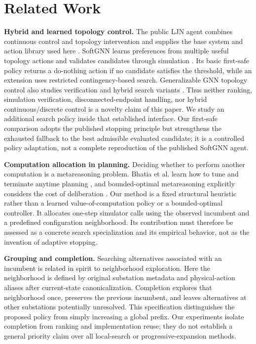 \documentclass[letterpaper]{article}
\begin{document}
\section{Related Work}

\textbf{Hybrid and learned topology control.} The public LJN agent combines continuous control and topology intervention and supplies the base system and action library used here \citep{ljn2023agent}. SoftGNN learns preferences from multiple useful topology actions and validates candidates through simulation \citep{hassouna2025softgnn}. Its basic first-safe policy returns a do-nothing action if no candidate satisfies the threshold, while an extension uses restricted contingency-based search. Generalizable GNN topology control also studies verification and hybrid search variants \citep{dejong2025generalizablev1}. Thus neither ranking, simulation verification, disconnected-endpoint handling, nor hybrid continuous/discrete control is a novelty claim of this paper. We study an additional search policy inside that established interface. Our first-safe comparison adopts the published stopping principle but strengthens the exhausted fallback to the best admissible evaluated candidate; it is a controlled policy adaptation, not a complete reproduction of the published SoftGNN agent.


\textbf{Computation allocation in planning.} Deciding whether to perform another computation is a metareasoning problem. Bhatia et al. learn how to tune and terminate anytime planning \citep{bhatia2022metareasoning}, and bounded-optimal metareasoning explicitly considers the cost of deliberation \citep{milli2017metareasoning}. Our method is a fixed structural heuristic rather than a learned value-of-computation policy or a bounded-optimal controller. It allocates one-step simulator calls using the observed incumbent and a predefined configuration neighborhood. Its contribution must therefore be assessed as a concrete search specialization and its empirical behavior, not as the invention of adaptive stopping.


\textbf{Grouping and completion.} Searching alternatives associated with an incumbent is related in spirit to neighborhood exploration. Here the neighborhood is defined by original substation metadata and physical-action aliases after current-state canonicalization. Completion explores that neighborhood once, preserves the previous incumbent, and leaves alternatives at other substations potentially unresolved. This specification distinguishes the proposed policy from simply increasing a global prefix. Our experiments isolate completion from ranking and implementation reuse; they do not establish a general priority claim over all local-search or progressive-expansion methods.
\end{document}

